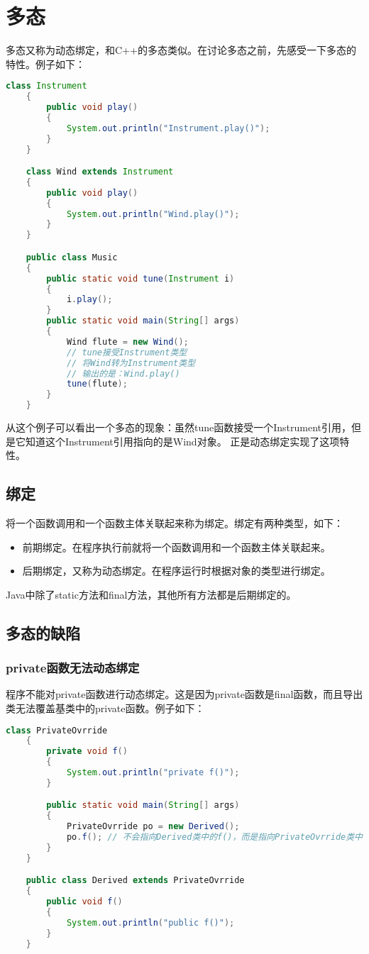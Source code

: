 \documentclass[a4paper,left=2.5cm,right=2.5cm,11pt]{article}
\begin{document}
\tableofcontents

\clearpage

\section{多态}
	多态又称为动态绑定，和C++的多态类似。在讨论多态之前，先感受一下多态的特性。例子如下：
	\begin{lstlisting}[language = Java]
	class Instrument
	{
		public void play()
		{
			System.out.println("Instrument.play()");
		}
	}

	class Wind extends Instrument
	{
		public void play()
		{
			System.out.println("Wind.play()");
		}
	}

	public class Music
	{
		public static void tune(Instrument i)
		{
			i.play();
		}
		public static void main(String[] args)
		{
			Wind flute = new Wind();
			// tune接受Instrument类型
			// 将Wind转为Instrument类型
			// 输出的是：Wind.play()
			tune(flute); 
		}
	}
	\end{lstlisting}

	从这个例子可以看出一个多态的现象：虽然tune函数接受一个Instrument引用，但是它知道这个Instrument引用指向的是Wind对象。
	正是动态绑定实现了这项特性。

\subsection{绑定}
	将一个函数调用和一个函数主体关联起来称为绑定。绑定有两种类型，如下：
	\begin{itemize}
		\item 前期绑定。在程序执行前就将一个函数调用和一个函数主体关联起来。
		\item 后期绑定，又称为动态绑定。在程序运行时根据对象的类型进行绑定。
	\end{itemize}

	Java中除了static方法和final方法，其他所有方法都是后期绑定的。

\subsection{多态的缺陷}
\subsubsection{private函数无法动态绑定}
	程序不能对private函数进行动态绑定。这是因为private函数是final函数，而且导出类无法覆盖基类中的private函数。例子如下：
	\begin{lstlisting}[language = Java]
	class PrivateOvrride
	{
		private void f()
		{
			System.out.println("private f()");
		}

		public static void main(String[] args)
		{
			PrivateOvrride po = new Derived();
			po.f(); // 不会指向Derived类中的f()，而是指向PrivateOvrride类中的f()
		}
	}

	public class Derived extends PrivateOvrride
	{
		public void f()
		{
			System.out.println("public f()");
		}
	}
	\end{lstlisting}
\end{document}
